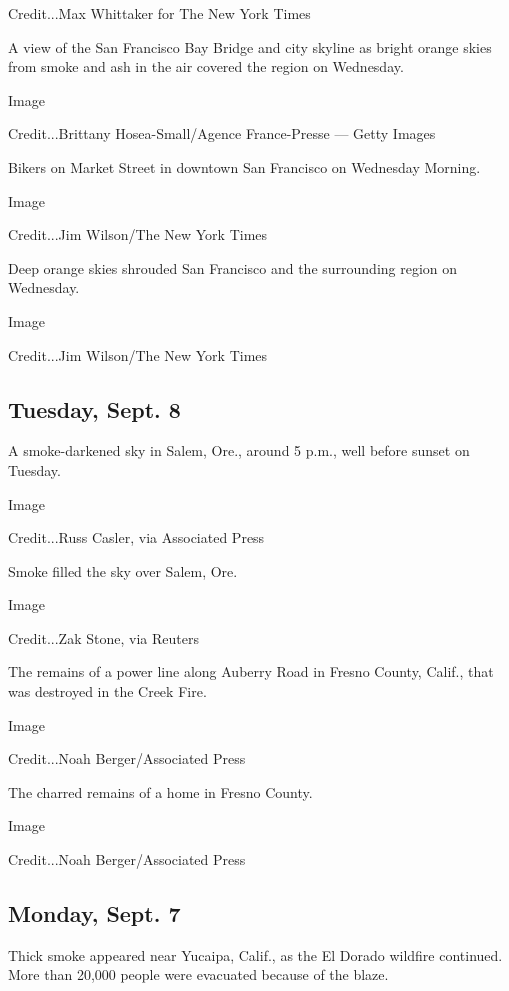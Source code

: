 Credit...Max Whittaker for The New York Times

A view of the San Francisco Bay Bridge and city skyline as bright orange
skies from smoke and ash in the air covered the region on Wednesday.

Image

Credit...Brittany Hosea-Small/Agence France-Presse --- Getty Images

Bikers on Market Street in downtown San Francisco on Wednesday Morning.

Image

Credit...Jim Wilson/The New York Times

Deep orange skies shrouded San Francisco and the surrounding region on
Wednesday.

Image

Credit...Jim Wilson/The New York Times

\hypertarget{tuesday-sept-8}{%
\subsection{Tuesday, Sept. 8}\label{tuesday-sept-8}}

A smoke-darkened sky in Salem, Ore., around 5 p.m., well before sunset
on Tuesday.

Image

Credit...Russ Casler, via Associated Press

Smoke filled the sky over Salem, Ore.

Image

Credit...Zak Stone, via Reuters

The remains of a power line along Auberry Road in Fresno County, Calif.,
that was destroyed in the Creek Fire.

Image

Credit...Noah Berger/Associated Press

The charred remains of a home in Fresno County.

Image

Credit...Noah Berger/Associated Press

\hypertarget{monday-sept-7}{%
\subsection{Monday, Sept. 7}\label{monday-sept-7}}

Thick smoke appeared near Yucaipa, Calif., as the El Dorado wildfire
continued. More than 20,000 people were evacuated because of the blaze.

